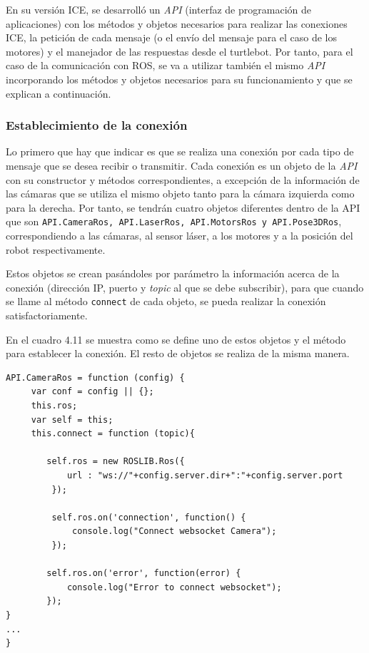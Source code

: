 En su versión ICE, se desarrolló un \textit{API} (interfaz de programación de aplicaciones) con los métodos y objetos necesarios para realizar las conexiones ICE, la petición de cada mensaje (o el envío del mensaje para el caso de los motores) y el manejador de las respuestas desde el turtlebot. Por tanto, para el caso de la comunicación con ROS, se va a utilizar también el mismo \textit{API} incorporando los métodos y objetos necesarios para su funcionamiento y que se explican a continuación.

\subsubsection{Establecimiento de la conexión}
Lo primero que hay que indicar es que se realiza una conexión por cada tipo de mensaje que se desea recibir o transmitir. Cada conexión es un objeto de la \textit{API} con su constructor y métodos correspondientes, a excepción de la información de las cámaras que se utiliza el mismo objeto tanto para la cámara izquierda como para la derecha. Por tanto, se tendrán cuatro objetos diferentes dentro de la API que son \texttt{API.CameraRos, API.LaserRos, API.MotorsRos y API.Pose3DRos}, correspondiendo a las cámaras, al sensor láser, a los motores y a la posición del robot respectivamente.

Estos objetos se crean pasándoles por parámetro la información acerca de la conexión (dirección IP, puerto y \textit{topic} al que se debe subscribir), para que cuando se llame al método \texttt{connect} de cada objeto, se pueda realizar la conexión satisfactoriamente.

En el cuadro 4.11 se muestra como se define uno de estos objetos y el método para establecer la conexión. El resto de objetos se realiza de la misma manera.

\begin{lstlisting}[caption= Establecimiento de la conexión ROS , label=cod.conexionturtlebot]
API.CameraRos = function (config) {
	 var conf = config || {};
	 this.ros;
	 var self = this;
   	 this.connect = function (topic){
	
        self.ros = new ROSLIB.Ros({
            url : "ws://"+config.server.dir+":"+config.server.port
         });

         self.ros.on('connection', function() {
             console.log("Connect websocket Camera");
         });
         
        self.ros.on('error', function(error) {
            console.log("Error to connect websocket");
        });
}
...
}
\end{lstlisting}

